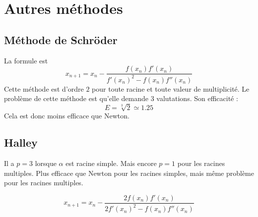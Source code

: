 \section{Autres méthodes}

\subsection{Méthode de Schröder}

La formule est
\begin{equation}
    x_{n+1}=x_n-\frac{ f(x_n)f'(x_n) }{ f'(x_n)^2-f(x_n)f''(x_n) }
\end{equation}
Cette méthode est d'ordre \( 2\) pour toute racine et toute valeur de multiplicité. Le problème de cette méthode est qu'elle demande \( 3\) valutations. Son efficacité :
\begin{equation}
    E=\sqrt[3]{ 2 }\simeq 1.25
\end{equation}
Cela est donc moins efficace que Newton.

\subsection{Halley}

Il a \( p=3\) lorsque \( \alpha\) est racine simple. Mais encore \( p=1\) pour les racines multiples. Plus efficace que Newton pour les racines simples, mais même problème pour les racines multiples.

\begin{equation}
    x_{n+1}=x_n-\frac{ 2f(x_n)f'(x_n) }{ 2f'(x_n)^2-f(x_n)f''(x_n) }
\end{equation}

